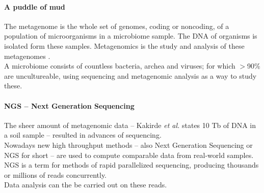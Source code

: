 \documentclass[twocolumn]{bmcart}%
\begin{document}
\paragraph*{A puddle of mud}
The metagenome is the whole set of genomes, coding or noncoding, of a population of microorganisms in a microbiome sample. The DNA of organisms is isolated form these samples. Metagenomics is the study and analysis of these metagenomes \cite{handelsman2004metagenomics}.\\
A microbiome consists of countless bacteria, archea and viruses; for which $>$90\% are uncultureable, using sequencing and metagenomic analysis as a way to study these.

\paragraph*{NGS -- Next Generation Sequencing}
The sheer amount of metagenomic data -- Kakirde \textit{et al.}\cite{KAKIRDE20101911} states 10 Tb of DNA in a soil sample -- resulted in advances of sequencing.\\
Nowadays new high throughput methods -- also Next Generation Sequencing or NGS for short -- are used to compute comparable data from real-world samples. NGS is a term for methods of rapid parallelized sequencing, producing thousands or millions of reads concurrently.\\
 Data analysis can the be carried out on these reads.
\end{document}
